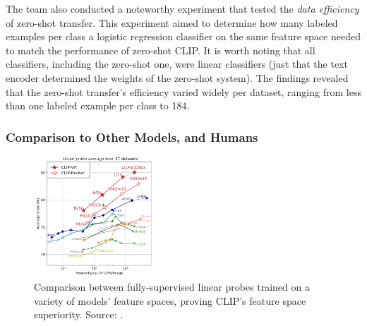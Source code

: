 \documentclass{article}
\begin{document}
\medskip
\noindent
The team also conducted a noteworthy experiment that tested the \emph{data efficiency} of zero-shot transfer. This experiment aimed to determine how many labeled examples per class a logistic regression classifier on the same feature space needed to match the performance of zero-shot CLIP. It is worth noting that all classifiers, including the zero-shot one, were linear classifiers (just that the text encoder determined the weights of the zero-shot system). The findings revealed that the zero-shot transfer's efficiency varied widely per dataset, ranging from less than one labeled example per class to 184.



\subsubsection{Comparison to Other Models, and Humans}
\label{subsec:clip-other-models}


\begin{figure}
    \centering
    \vspace{-2mm}
    \includegraphics[width=0.4\textwidth]{figures/clip_fig10.png}
    \caption{
        Comparison between fully-supervised linear probes trained on a variety of models' feature spaces, proving CLIP's feature space superiority. Source: \citet{radford2021clip}.
    }
    \label{fig:clip_fig10}
    \vspace{-4mm}
\end{figure}
\end{document}
